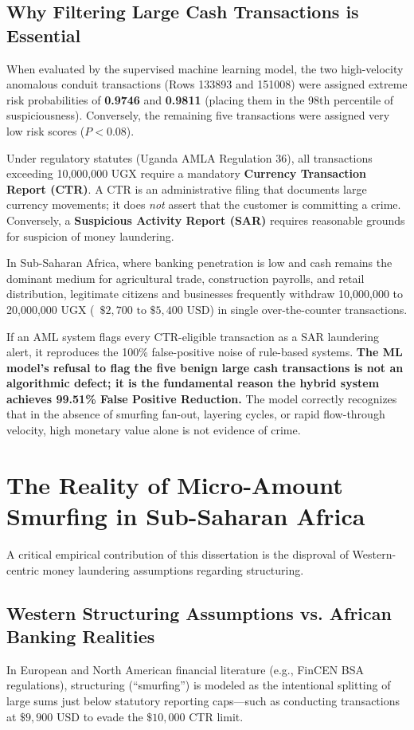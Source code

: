 \subsection{Why Filtering Large Cash Transactions is Essential}
When evaluated by the supervised machine learning model, the two high-velocity anomalous conduit transactions (Rows 133893 and 151008) were assigned extreme risk probabilities of \textbf{0.9746} and \textbf{0.9811} (placing them in the 98th percentile of suspiciousness). Conversely, the remaining five transactions were assigned very low risk scores ($P < 0.08$).

Under regulatory statutes (Uganda AMLA Regulation 36), all transactions exceeding 10,000,000 UGX require a mandatory \textbf{Currency Transaction Report (CTR)}. A CTR is an administrative filing that documents large currency movements; it does \textit{not} assert that the customer is committing a crime. Conversely, a \textbf{Suspicious Activity Report (SAR)} requires reasonable grounds for suspicion of money laundering. 

In Sub-Saharan Africa, where banking penetration is low and cash remains the dominant medium for agricultural trade, construction payrolls, and retail distribution, legitimate citizens and businesses frequently withdraw 10,000,000 to 20,000,000 UGX (~$\$2,700\text{ to }\$5,400\text{ USD}$) in single over-the-counter transactions. 

If an AML system flags every CTR-eligible transaction as a SAR laundering alert, it reproduces the 100\% false-positive noise of rule-based systems. \textbf{The ML model's refusal to flag the five benign large cash transactions is not an algorithmic defect; it is the fundamental reason the hybrid system achieves 99.51\% False Positive Reduction.} The model correctly recognizes that in the absence of smurfing fan-out, layering cycles, or rapid flow-through velocity, high monetary value alone is not evidence of crime.

\section{The Reality of Micro-Amount Smurfing in Sub-Saharan Africa}
A critical empirical contribution of this dissertation is the disproval of Western-centric money laundering assumptions regarding structuring.

\subsection{Western Structuring Assumptions vs. African Banking Realities}
In European and North American financial literature (e.g., FinCEN BSA regulations), structuring (``smurfing'') is modeled as the intentional splitting of large sums just below statutory reporting caps---such as conducting transactions at $\$9,900\text{ USD}$ to evade the $\$10,000$ CTR limit. 

